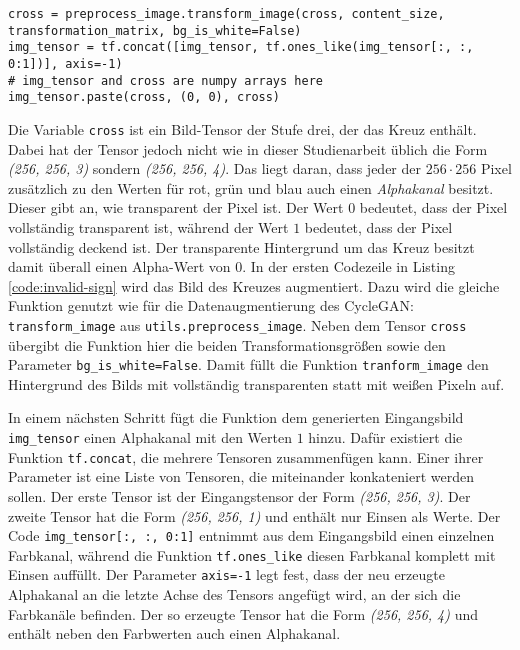 \begin{code}
	\begin{verbatim}
cross = preprocess_image.transform_image(cross, content_size, transformation_matrix, bg_is_white=False)
img_tensor = tf.concat([img_tensor, tf.ones_like(img_tensor[:, :, 0:1])], axis=-1)
# img_tensor and cross are numpy arrays here
img_tensor.paste(cross, (0, 0), cross)
	\end{verbatim}
	\caption{\lstinline[language=python]{utils.image_augmentation.py} - Schilder als ungültig markieren}
	\label{code:invalid-sign}
\end{code}

Die Variable \texttt{cross} ist ein Bild-Tensor der Stufe drei, der das Kreuz enthält. Dabei hat der Tensor jedoch nicht wie in dieser Studienarbeit üblich die Form \emph{(256, 256, 3)} sondern \emph{(256, 256, 4)}. Das liegt daran, dass jeder der $256\cdot 256$ Pixel zusätzlich zu den Werten für rot, grün und blau auch einen \emph{Alphakanal} besitzt. Dieser gibt an, wie transparent der Pixel ist. Der Wert $0$ bedeutet, dass der Pixel vollständig transparent ist, während der Wert $1$ bedeutet, dass der Pixel vollständig deckend ist. Der transparente Hintergrund um das Kreuz besitzt damit überall einen Alpha-Wert von $0$. In der ersten Codezeile in Listing \ref{code:invalid-sign} wird das Bild des Kreuzes augmentiert. Dazu wird die gleiche Funktion genutzt wie für die Datenaugmentierung des \ac{CycleGAN}: \texttt{transform_image} aus \texttt{utils.preprocess_image}. Neben dem Tensor \texttt{cross} übergibt die Funktion hier die beiden Transformationsgrößen sowie den Parameter \texttt{bg_is_white=False}. Damit füllt die Funktion \texttt{tranform_image} den Hintergrund des Bilds mit vollständig transparenten statt mit weißen Pixeln auf.

In einem nächsten Schritt fügt die Funktion dem generierten Eingangsbild \texttt{img_tensor} einen Alphakanal mit den Werten $1$ hinzu. Dafür existiert die Funktion \texttt{tf.concat}, die mehrere Tensoren zusammenfügen kann. Einer ihrer Parameter ist eine Liste von Tensoren, die miteinander konkateniert werden sollen. Der erste Tensor ist der Eingangstensor der Form \emph{(256, 256, 3)}. Der zweite Tensor hat die Form \emph{(256, 256, 1)} und enthält nur Einsen als Werte. Der Code \texttt{img_tensor[:, :, 0:1]} entnimmt aus dem Eingangsbild einen einzelnen Farbkanal, während die Funktion \texttt{tf.ones_like} diesen Farbkanal komplett mit Einsen auffüllt. Der Parameter \texttt{axis=-1} legt fest, dass der neu erzeugte Alphakanal an die letzte Achse des Tensors angefügt wird, an der sich die Farbkanäle befinden. Der so erzeugte Tensor hat die Form \emph{(256, 256, 4)} und enthält neben den Farbwerten auch einen Alphakanal.


